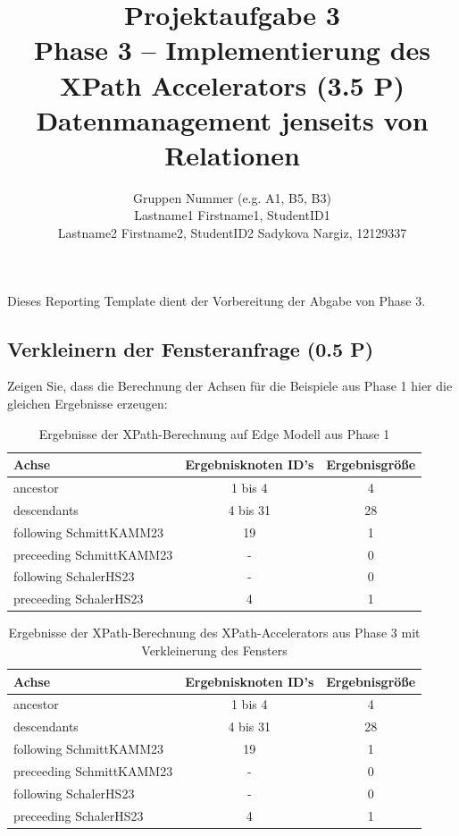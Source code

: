 \documentclass[11pt]{scrartcl}
\title{
  \textbf{\large Projektaufgabe 3 } \\
  Phase 3 – Implementierung des XPath Accelerators (3.5 P) \\
  {\large Datenmanagement jenseits von Relationen}
}
\author{
  Gruppen Nummer (e.g. A1, B5, B3) \\
  \large Lastname1 Firstname1, StudentID1 \\
  \large Lastname2 Firstname2, StudentID2 
  \large Sadykova Nargiz, 12129337
}
\begin{document}
\maketitle\thispagestyle{empty}

Dieses Reporting Template dient der Vorbereitung der Abgabe von Phase 3. 

\subsection*{Verkleinern der Fensteranfrage (0.5 P)}

Zeigen Sie, dass die Berechnung der Achsen für die Beispiele aus Phase 1 hier die gleichen Ergebnisse erzeugen:

\begin{table}[h]
	\centering
		\begin{center}
			\begin{tabular}{ l | c c }
				\toprule
				Achse & Ergebnisknoten ID's & Ergebnisgröße\\
				\midrule
				ancestor & 1 bis 4 & 4 \\ 
				descendants & 4 bis 31 & 28 \\  
				following SchmittKAMM23& 19 & 1 \\  
				preceeding SchmittKAMM23 & - & 0 \\ 
				following SchalerHS23& - & 0 \\  
				preceeding SchalerHS23& 4 & 1 \\ 
				\bottomrule
			\end{tabular}
			\end{center}
	\caption{Ergebnisse der XPath-Berechnung auf Edge Modell aus Phase 1}
	\label{tab:ErgebnisseDerXPathBerechnug}
\end{table}

\begin{table}[h]
	\centering
		\begin{center}
			\begin{tabular}{ l | c c }
				\toprule
				Achse & Ergebnisknoten ID's & Ergebnisgröße\\
				\midrule
				ancestor & 1 bis 4 & 4 \\ 
				descendants & 4 bis 31 & 28 \\  
				following SchmittKAMM23& 19 & 1 \\  
				preceeding SchmittKAMM23 & - & 0 \\ 
				following SchalerHS23& - & 0 \\  
				preceeding SchalerHS23& 4 & 1 \\ 
				\bottomrule
			\end{tabular}
			\end{center}
	\caption{Ergebnisse der XPath-Berechnung des XPath-Accelerators aus Phase 3 mit Verkleinerung des Fensters}
	\label{tab:ErgebnisseDerXPathBerechnug}
\end{table}
\end{document}
